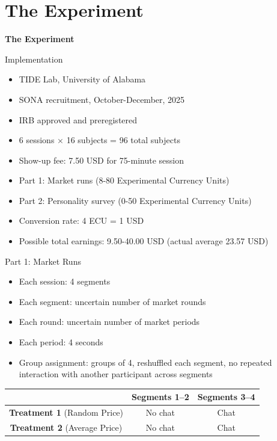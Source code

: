 \documentclass{beamer}
\begin{document}
\section{The Experiment}

\begin{frame}{ }
 \begin{center}
     \textbf{The Experiment}
 \end{center}
\end{frame}


\begin{frame}{Implementation}
\begin{itemize}
    \item TIDE Lab, University of Alabama
    \item SONA recruitment, October-December, 2025
    \item IRB approved and preregistered
    \item  6 sessions $\times$ 16 subjects = 96 total subjects
    \item Show-up fee: 7.50 USD for 75-minute session
    \item Part 1: Market runs (8-80 Experimental Currency Units) 
    \item Part 2: Personality survey (0-50 Experimental Currency Units) 
    \item Conversion rate: 4 ECU = 1 USD
    \item Possible total earnings: 9.50-40.00 USD (actual average 23.57 USD)
\end{itemize}
\end{frame}


\begin{frame}{Part 1: Market Runs}
\begin{itemize}
    \item Each session: 4 segments   
    \item Each segment: uncertain number of market rounds
    \item Each round: uncertain number of market periods  
    \item Each period: 4 seconds   
    \item Group assignment: groups of 4, reshuffled each segment, no repeated interaction with another participant across segments
\end{itemize}

\vspace{0.3cm}
\begin{center}
\begin{tabular}{ccc}
\toprule
& \textbf{Segments 1--2} & \textbf{Segments 3--4} \\
\midrule
\textbf{Treatment 1} (Random Price) & No chat & Chat \\
\textbf{Treatment 2} (Average Price) & No chat & Chat \\
\bottomrule
\end{tabular}
\end{center}
\end{frame}
\end{document}
